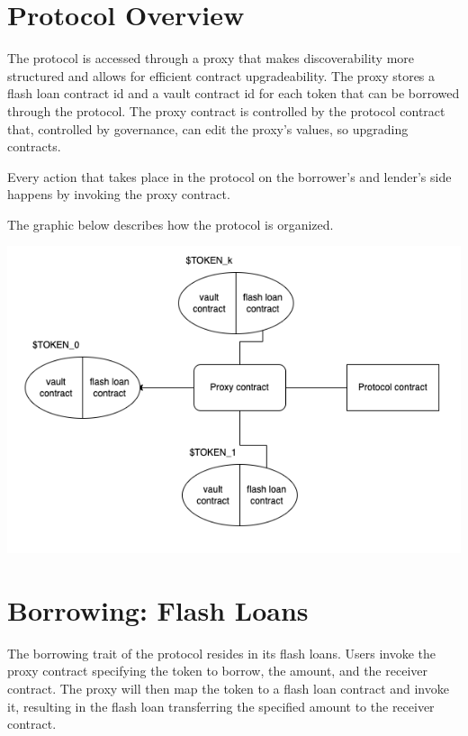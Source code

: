 \documentclass[twocolumn]{article}
\begin{document}
\vspace{20px}

\section{Protocol Overview}
The protocol is accessed through a proxy that makes discoverability more structured and allows for efficient contract upgradeability. The proxy stores a flash loan contract id and a vault contract id for each token that can be borrowed through the protocol. The proxy contract is controlled by the protocol contract that, controlled by governance, can edit the proxy's values, so upgrading contracts. 

Every action that takes place in the protocol on the borrower's and lender's side happens by invoking the proxy contract.

The graphic below describes how the protocol is organized.

\includegraphics[scale=0.35]{protocol}

\vspace{20px}

\section{Borrowing: Flash Loans}

The borrowing trait of the protocol resides in its flash loans. Users invoke the proxy contract specifying the token to borrow, the amount, and the receiver contract. The proxy will then map the token to a flash loan contract and invoke it, resulting in the flash loan transferring the specified amount to the receiver contract. 
\end{document}
